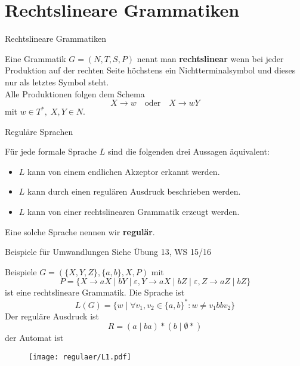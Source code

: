 \section{Rechtslineare Grammatiken}
\begin{frame}{Rechtslineare Grammatiken}
	\begin{Definition}
		Eine Grammatik $G = (N, T, S, P)$ nennt man \textbf{rechtslinear} wenn bei jeder Produktion auf der rechten Seite höchstens ein Nichtterminalsymbol und dieses nur als letztes Symbol steht.\\
		Alle Produktionen folgen dem Schema $$X \to w \quad \text{oder} \quad X \to wY$$ mit $w \in T^*, \; X,Y \in N$.
	\end{Definition}
\end{frame}

\begin{frame}{Reguläre Sprachen}
	\begin{Satz}
		Für jede formale Sprache $L$ sind die folgenden drei Aussagen äquivalent:
		\begin{itemize}
			\item $L$ kann von einem endlichen Akzeptor erkannt werden.
			\item $L$ kann durch einen regulären Ausdruck beschrieben werden.
			\item $L$ kann von einer rechtslinearen Grammatik erzeugt werden.
		\end{itemize}
	\end{Satz}
	
	Eine solche Sprache nennen wir \textbf{regulär}.
\end{frame}

\begin{frame}{Beispiele für Umwandlungen}
	Siehe Übung 13, WS 15/16
\end{frame}

\begin{frame}{Beispiele}
	$G = (\{X, Y, Z\}, \{a, b\}, X, P )$ mit $$P = \{X \to aX \mid bY \mid \varepsilon, Y \to aX \mid bZ \mid \varepsilon, Z \to aZ \mid bZ\}$$ ist eine rechtslineare Grammatik. Die Sprache ist \pause $$L(G) = \{ w \mid \forall v_1, v_2 \in \{a,b\}^\ast: w \neq v_1 bb v_2 \}$$ Der reguläre Ausdruck ist \pause $$R =  (a\mid ba)\ast (b \mid \emptyset *)  $$ der Automat ist 
\end{frame}

\begin{frame}
	\begin{figure}[H]
		\centering
		\texttt{[image: regulaer/L1.pdf]}
	\end{figure}
\end{frame}

